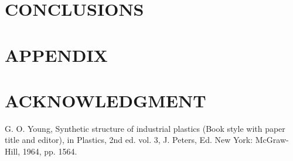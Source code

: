 \documentclass[letterpaper, 10 pt, conference]{ieeeconf}
\begin{document}
\section{CONCLUSIONS}

\lipsum[1]








\section*{APPENDIX}

\lipsum[1]

\section*{ACKNOWLEDGMENT}

\lipsum[1]


\begin{thebibliography}{99}

 G. O. Young, Synthetic structure of industrial plastics (Book style with paper title and editor), in Plastics, 2nd ed. vol. 3, J. Peters, Ed.  New York: McGraw-Hill, 1964, pp. 1564.

\end{thebibliography}
\end{document}
